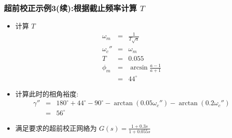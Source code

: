 \documentclass[table]{beamer}
\begin{document}
\begin{frame}
\frametitle{超前校正示例3(续):根据截止频率计算  $T$}
\label{sec-2-10}

\begin{itemize}
\item 计算 $T$
      \begin{eqnarray*}
      \omega_m &=& \frac{1}{T\sqrt{a}} \\
      \omega_c'' &=& \omega_m \\
      T &=& 0.055 \\
      \phi_m &=& \arcsin\frac{a-1}{a+1} \\
      &=& 44^{\circ} 
      \end{eqnarray*}
\item <2->计算此时的相角裕度: 
      \begin{eqnarray*}
      \gamma'' &=& 180^{\circ}+44^{\circ}-90^{\circ}-\arctan(0.05\omega_c'')-\arctan(0.2\omega_c'') \\
       &=& 56^{\circ}
      \end{eqnarray*}
\item <2->满足要求的超前校正网絡为  $G(s)=\frac{1+0.3s}{1+0.055s}$
\end{itemize}
\end{frame}
\end{document}
